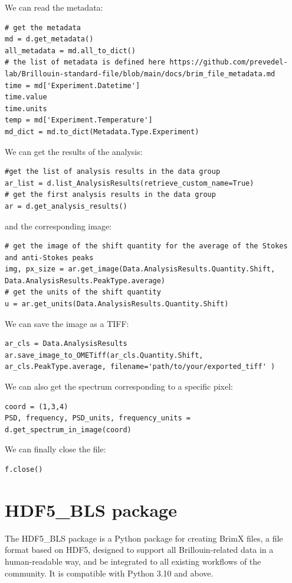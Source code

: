 \documentclass{article}
\begin{document}
We can read the metadata:
\begin{lstlisting}
# get the metadata 
md = d.get_metadata()
all_metadata = md.all_to_dict()
# the list of metadata is defined here https://github.com/prevedel-lab/Brillouin-standard-file/blob/main/docs/brim_file_metadata.md
time = md['Experiment.Datetime']
time.value
time.units
temp = md['Experiment.Temperature']
md_dict = md.to_dict(Metadata.Type.Experiment)
\end{lstlisting}

We can get the results of the analysis:
\begin{lstlisting}
#get the list of analysis results in the data group
ar_list = d.list_AnalysisResults(retrieve_custom_name=True)
# get the first analysis results in the data group
ar = d.get_analysis_results()
\end{lstlisting}
and the corresponding image: 
\begin{lstlisting}
# get the image of the shift quantity for the average of the Stokes and anti-Stokes peaks
img, px_size = ar.get_image(Data.AnalysisResults.Quantity.Shift, Data.AnalysisResults.PeakType.average)
# get the units of the shift quantity
u = ar.get_units(Data.AnalysisResults.Quantity.Shift)
\end{lstlisting}
We can save the image as a TIFF: 
\begin{lstlisting}
ar_cls = Data.AnalysisResults
ar.save_image_to_OMETiff(ar_cls.Quantity.Shift, ar_cls.PeakType.average, filename='path/to/your/exported_tiff' )
\end{lstlisting}
We can also get the spectrum corresponding to a specific pixel:
\begin{lstlisting}
coord = (1,3,4)
PSD, frequency, PSD_units, frequency_units = d.get_spectrum_in_image(coord)
\end{lstlisting}

We can finally close the file:
\begin{lstlisting}
f.close()
\end{lstlisting}

\section{HDF5\_BLS package}

The HDF5\_BLS package is a Python package for creating BrimX files, a file format based on HDF5, designed to support all Brillouin-related data in a human-readable way, and be integrated to all existing workflows of the community. It is compatible with Python 3.10 and above. 
\end{document}
